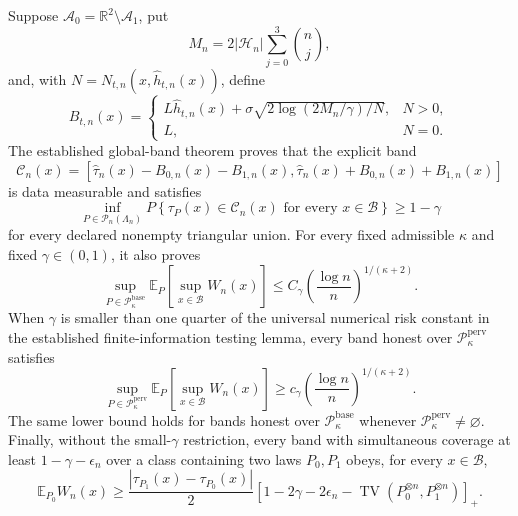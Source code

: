 Suppose \(\mathcal A_0=\mathbb R^2\setminus\mathcal A_1\), put
\[
 M_n=2|\mathcal H_n|\sum_{j=0}^3\binom nj,
\]
and, with \(N=N_{t,n}(x,\widehat h_{t,n}(x))\), define
\[
 B_{t,n}(x)=
 \begin{cases}
 L\widehat h_{t,n}(x)+\sigma\sqrt{2\log(2M_n/\gamma)/N},&N>0,\\
 L,&N=0.
 \end{cases}
\]
The established global-band theorem proves that the explicit band
\[
 \mathcal C_n(x)=
 \left[\widehat\tau_n(x)-B_{0,n}(x)-B_{1,n}(x),
 \widehat\tau_n(x)+B_{0,n}(x)+B_{1,n}(x)\right]
\]
is data measurable and satisfies
\[
 \inf_{P\in\mathcal P_n(\Lambda_n)}
 P\!\left\{\tau_P(x)\in\mathcal C_n(x)
 \text{ for every }x\in\mathcal B\right\}\ge 1-\gamma
\]
for every declared nonempty triangular union.  For every fixed admissible \(\kappa\) and fixed \(\gamma\in(0,1)\), it also proves
\[
 \sup_{P\in\mathcal P_{\kappa}^{\mathrm{base}}}
 \mathbb E_P\!\left[\sup_{x\in\mathcal B}W_n(x)\right]
 \le C_\gamma\left(\frac{\log n}{n}\right)^{1/(\kappa+2)}.
\]
When \(\gamma\) is smaller than one quarter of the universal numerical risk constant in the established finite-information testing lemma, every band honest over \(\mathcal P_{\kappa}^{\mathrm{perv}}\) satisfies
\[
 \sup_{P\in\mathcal P_{\kappa}^{\mathrm{perv}}}
 \mathbb E_P\!\left[\sup_{x\in\mathcal B}W_n(x)\right]
 \ge c_\gamma\left(\frac{\log n}{n}\right)^{1/(\kappa+2)}.
\]
The same lower bound holds for bands honest over \(\mathcal P_{\kappa}^{\mathrm{base}}\) whenever \(\mathcal P_{\kappa}^{\mathrm{perv}}\ne\varnothing\).  Finally, without the small-\(\gamma\) restriction, every band with simultaneous coverage at least \(1-\gamma-\epsilon_n\) over a class containing two laws \(P_0,P_1\) obeys, for every \(x\in\mathcal B\),
\[
 \mathbb E_{P_0}W_n(x)\ge
 \frac{|\tau_{P_1}(x)-\tau_{P_0}(x)|}{2}
 \left[1-2\gamma-2\epsilon_n-
 \operatorname{TV}(P_0^{\otimes n},P_1^{\otimes n})\right]_+.
\]